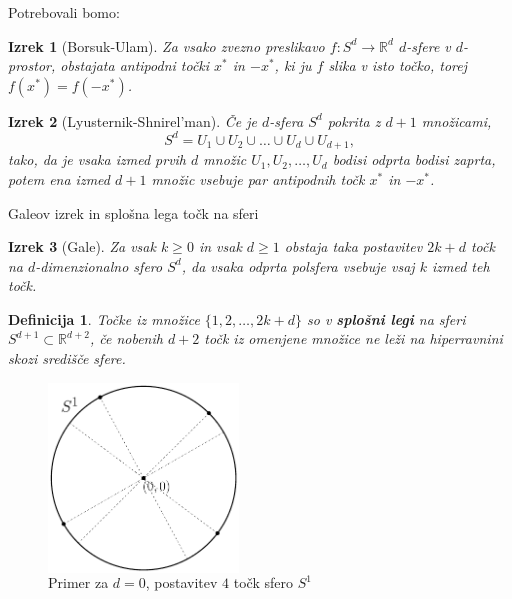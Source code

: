 \documentclass{beamer}
\newtheorem{izrek}{Izrek}
\newtheorem{definicija}{Definicija}
\begin{document}

\begin{frame}{Potrebovali bomo:}

\begin{izrek}[Borsuk-Ulam]
Za vsako zvezno preslikavo $f:S^d \rightarrow \mathbb{R}^d$ $d$-sfere v $d$-prostor, obstajata antipodni točki $x^*$ in $-x^*$, ki ju $f$ slika v isto točko, torej $f(x^*)=f(-x^*)$.
\end{izrek}

\pause

\begin{izrek}[Lyusternik-Shnirel'man]
Če je $d$-sfera $S^d$ pokrita z $d+1$ množicami,
$$S^d = U_1 \cup U_2 \cup \ldots \cup U_d \cup U_{d+1},$$
tako, da je vsaka izmed prvih $d$ množic $U_1, U_2, \ldots, U_d$ bodisi odprta bodisi zaprta, potem ena izmed $d+1$ množic vsebuje par antipodnih točk $x^*$ in $-x^*$.
\end{izrek}

\end{frame}


\begin{frame}{Galeov izrek in splošna lega točk na sferi}

\begin{izrek}[Gale]
Za vsak $k \geq 0$ in vsak $d \geq 1$ obstaja taka postavitev $2k+d$ točk na $d$-dimenzionalno sfero $S^d$, da vsaka odprta polsfera vsebuje vsaj $k$ izmed teh točk.
\end{izrek}

\pause

\begin{definicija}
Točke iz množice $\{1,2,\ldots,2k+d\}$ so v \textbf {splošni legi} na sferi $S^{d+1} \subset \mathbb{R}^{d+2}$, če nobenih $d+2$ točk iz omenjene množice ne leži na hiperravnini skozi središče sfere.
\end{definicija}


\begin{figure}
\begin{columns}
\caption{Primer za $d=0$, postavitev $4$ točk sfero $S^1$}
\includegraphics[width=0.45\textwidth]{splosna_lega}
\end{columns}
\end{figure}


\end{frame}
\end{document}

